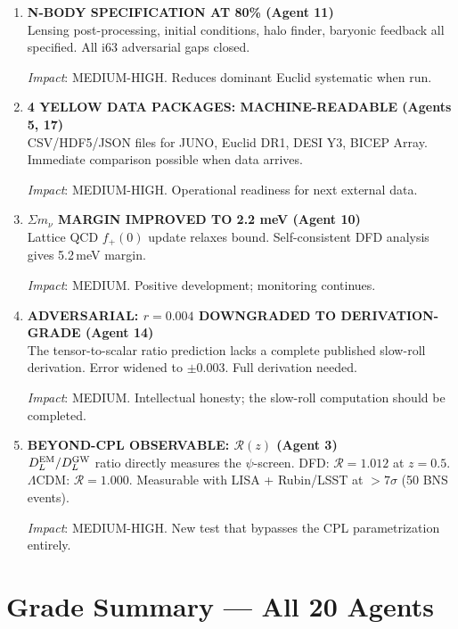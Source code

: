 \documentclass[11pt,a4paper]{article}
\begin{document}
\begin{enumerate}[label=\textbf{\arabic*.}, leftmargin=1.5cm]
\item \textbf{N-BODY SPECIFICATION AT 80\% (Agent 11)}\\
Lensing post-processing, initial conditions, halo finder, baryonic feedback all specified. All i63 adversarial gaps closed.

\textit{Impact}: MEDIUM-HIGH. Reduces dominant Euclid systematic when run.

\item \textbf{4 YELLOW DATA PACKAGES: MACHINE-READABLE (Agents 5, 17)}\\
CSV/HDF5/JSON files for JUNO, Euclid DR1, DESI Y3, BICEP Array. Immediate comparison possible when data arrives.

\textit{Impact}: MEDIUM-HIGH. Operational readiness for next external data.

\item \textbf{$\Sigma m_\nu$ MARGIN IMPROVED TO 2.2 meV (Agent 10)}\\
Lattice QCD $f_+(0)$ update relaxes bound. Self-consistent DFD analysis gives 5.2\,meV margin.

\textit{Impact}: MEDIUM. Positive development; monitoring continues.

\item \textbf{ADVERSARIAL: $r = 0.004$ DOWNGRADED TO DERIVATION-GRADE (Agent 14)}\\
The tensor-to-scalar ratio prediction lacks a complete published slow-roll derivation. Error widened to $\pm 0.003$. Full derivation needed.

\textit{Impact}: MEDIUM. Intellectual honesty; the slow-roll computation should be completed.

\item \textbf{BEYOND-CPL OBSERVABLE: $\mathcal{R}(z)$ (Agent 3)}\\
$D_L^{\rm EM}/D_L^{\rm GW}$ ratio directly measures the $\psi$-screen. DFD: $\mathcal{R} = 1.012$ at $z = 0.5$. $\Lambda$CDM: $\mathcal{R} = 1.000$. Measurable with LISA + Rubin/LSST at $> 7\sigma$ (50 BNS events).

\textit{Impact}: MEDIUM-HIGH. New test that bypasses the CPL parametrization entirely.

\end{enumerate}


\section{Grade Summary --- All 20 Agents}
\label{sec:grades}
\end{document}
